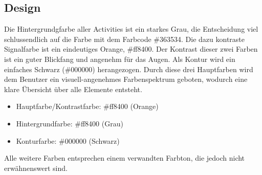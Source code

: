 \documentclass[FIPLY_base.tex]{subfiles}
\begin{document}
	\subsection{Design}
	Die Hintergrundgfarbe aller Activities ist ein starkes Grau, die Entscheidung viel schlussendlich auf die Farbe mit dem Farbcode \#363534. Die dazu kontraste Signalfarbe ist ein eindeutiges Orange, \#ff8400. Der Kontrast dieser zwei Farben ist ein guter Blickfang und angenehm für das Augen. Als Kontur wird ein einfaches Schwarz (\#000000) herangezogen. Durch diese drei Hauptfarben wird dem Benutzer ein visuell-angenehmes Farbenspektrum geboten, wodurch eine klare Übersicht über alle Elemente entsteht.
	\begin{itemize}
	 	\item Hauptfarbe/Kontrastfarbe: \#ff8400 (Orange)
	 	\item Hintergrundfarbe: \#ff8400 (Grau)
	 	\item Konturfarbe: \#000000 (Schwarz)
	\end{itemize}
	Alle weitere Farben entsprechen einem verwandten Farbton, die jedoch nicht erwähnenswert sind.
	
\end{document}
